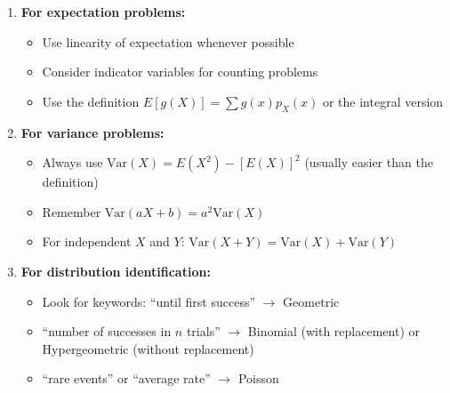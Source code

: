 \begin{enumerate}
    \item \textbf{For expectation problems:}
    \begin{itemize}
        \item Use linearity of expectation whenever possible
        \item Consider indicator variables for counting problems
        \item Use the definition \(E[g(X)] = \sum g(x) p_X(x)\) or the integral version
    \end{itemize}
    
    \item \textbf{For variance problems:}
    \begin{itemize}
        \item Always use \(\text{Var}(X) = E(X^2) - [E(X)]^2\) (usually easier than the definition)
        \item Remember \(\text{Var}(aX + b) = a^2 \text{Var}(X)\)
        \item For independent \(X\) and \(Y\): \(\text{Var}(X + Y) = \text{Var}(X) + \text{Var}(Y)\)
    \end{itemize}
    
    \item \textbf{For distribution identification:}
    \begin{itemize}
        \item Look for keywords: ``until first success'' \(\rightarrow\) Geometric
        \item ``number of successes in \(n\) trials'' \(\rightarrow\) Binomial (with replacement) or Hypergeometric (without replacement)
        \item ``rare events'' or ``average rate'' \(\rightarrow\) Poisson
    \end{itemize}
\end{enumerate}